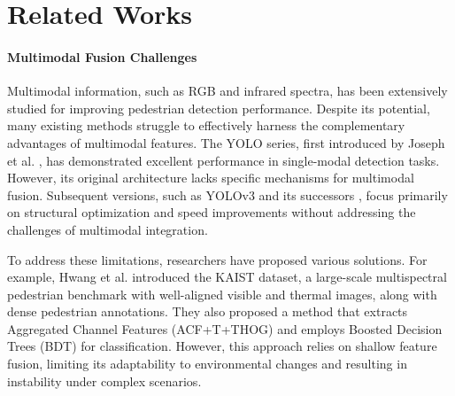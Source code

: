 



















\newcommand{\supplementarytitle}{
}


\supplementarytitle

\renewcommand{\thesection}{\arabic{section}}
\setcounter{section}{0}

\renewcommand{\thefigure}{\arabic{figure}}
\setcounter{figure}{0}

\renewcommand{\thetable}{\arabic{table}}
\setcounter{table}{0}

\section{Related Works}

\paragraph{Multimodal Fusion Challenges}
Multimodal information, such as RGB and infrared spectra, has been extensively studied for improving pedestrian detection performance. Despite its potential, many existing methods struggle to effectively harness the complementary advantages of multimodal features. The YOLO series, first introduced by Joseph et al. \cite{5}, has demonstrated excellent performance in single-modal detection tasks. However, its original architecture lacks specific mechanisms for multimodal fusion. Subsequent versions, such as YOLOv3 \cite{5} and its successors \cite{6}, focus primarily on structural optimization and speed improvements without addressing the challenges of multimodal integration.

To address these limitations, researchers have proposed various solutions. For example, Hwang et al. \cite{7} introduced the KAIST dataset, a large-scale multispectral pedestrian benchmark with well-aligned visible and thermal images, along with dense pedestrian annotations. They also proposed a method that extracts Aggregated Channel Features (ACF+T+THOG) and employs Boosted Decision Trees (BDT) for classification. However, this approach relies on shallow feature fusion, limiting its adaptability to environmental changes and resulting in instability under complex scenarios.

